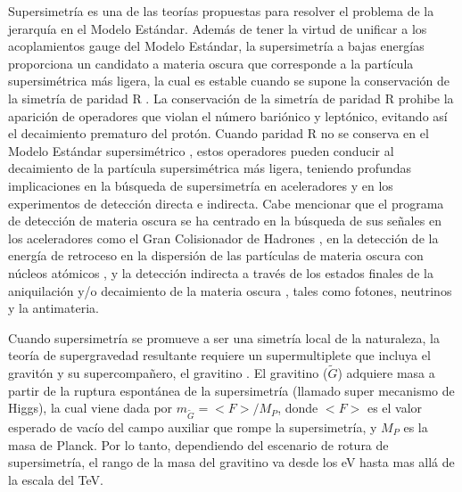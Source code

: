 Supersimetría \cite{Martin:1997ns,Haber:1984rc} es una de las teorías propuestas para resolver el problema de la jerarquía en el Modelo Estándar. Además de tener la virtud de unificar a los acoplamientos gauge del Modelo Estándar, la supersimetría a bajas energías proporciona un candidato a materia oscura que corresponde a la partícula supersimétrica más ligera, la cual es estable cuando se supone la conservación de la simetría de paridad R \cite{Ellis:1983ew}. La conservación de la simetría de paridad R prohibe la aparición de operadores que violan el número bariónico y leptónico, evitando así el decaimiento prematuro del protón. Cuando paridad R no se conserva en el Modelo Estándar supersimétrico \cite{Barbier:2004ez}, estos operadores pueden conducir al decaimiento de la partícula supersimétrica más ligera, teniendo profundas implicaciones en la búsqueda de supersimetría en aceleradores  y en los experimentos de detección directa  e indirecta. Cabe mencionar que el programa de detección de materia oscura se ha centrado en la búsqueda de sus señales en los aceleradores como el Gran Colisionador de Hadrones \cite{Baltz:2006fm,Cho:2008tj,Nath:2010zj}, en la detección de la energía de retroceso en la dispersión de las partículas de materia oscura con núcleos atómicos \cite{Green:2007rb,Bertone:2007xj,Drees:2008bv,Green:2008rd}, y la detección indirecta a través de los estados finales de la aniquilación y/o decaimiento de la materia oscura \cite{Bertone:2007aw,Eichler:1989br,Arvanitaki:2008hq,Ibarra:2008jk,Ibarra:2008qg,Buckley:2009kw,Ibarra:2009tn,Ruderman:2009ta}, tales como fotones, neutrinos y la antimateria. 

Cuando supersimetría se promueve a ser una simetría local de la naturaleza, la teoría de supergravedad resultante requiere un supermultiplete que incluya el gravitón y su supercompañero, el gravitino \cite{Martin:1997ns,Nilles:1983ge}. El gravitino ($\tilde G$) adquiere masa a partir de la ruptura espontánea de la supersimetría (llamado super mecanismo de Higgs), la cual viene dada por $m_{\tilde G}=<F>/M_P$, donde $<F>$ es el valor esperado de vacío del campo auxiliar que rompe la supersimetría, y $M_P$ es la masa de Planck. Por lo tanto, dependiendo del escenario de rotura de supersimetría, el rango de la masa del gravitino va desde los eV hasta mas allá de la escala del TeV. 

